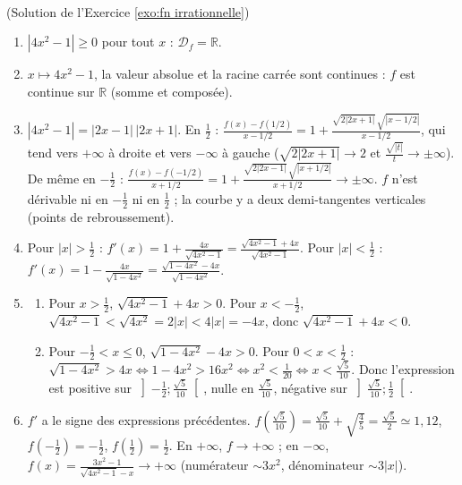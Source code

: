 \begin{corrige}
\begin{sol} ~ \\
(Solution de l'Exercice \ref{exo:fn irrationnelle})
\begin{enumerate}
\item $|4x^2 - 1| \geq 0$ pour tout $x$ : $\mathcal{D}_f = \mathbb{R}$.
\item $x \mapsto 4x^2 - 1$, la valeur absolue et la racine carr\'ee sont continues : $f$ est continue sur $\mathbb{R}$ (somme et compos\'ee).
\item $|4x^2 - 1| = |2x - 1|\,|2x + 1|$. En $\frac{1}{2}$ : $\frac{f(x) - f(1/2)}{x - 1/2} = 1 + \frac{\sqrt{2|2x+1|}\,\sqrt{|x - 1/2|}}{x - 1/2}$,
      qui tend vers $+\infty$ \`a droite et vers $-\infty$ \`a gauche ($\sqrt{2|2x+1|} \to 2$ et $\frac{\sqrt{|t|}}{t} \to \pm\infty$).
      De m\^eme en $-\frac{1}{2}$ : $\frac{f(x) - f(-1/2)}{x + 1/2} = 1 + \frac{\sqrt{2|2x-1|}\,\sqrt{|x+1/2|}}{x + 1/2} \to \pm\infty$.
      $f$ n'est d\'erivable ni en $-\frac{1}{2}$ ni en $\frac{1}{2}$ ; la courbe y a deux demi-tangentes verticales (points de rebroussement).
\item Pour $|x| > \frac{1}{2}$ : $f'(x) = 1 + \frac{4x}{\sqrt{4x^2-1}} = \frac{\sqrt{4x^2-1} + 4x}{\sqrt{4x^2-1}}$.
      Pour $|x| < \frac{1}{2}$ : $f'(x) = 1 - \frac{4x}{\sqrt{1-4x^2}} = \frac{\sqrt{1-4x^2} - 4x}{\sqrt{1-4x^2}}$.
\item \begin{enumerate}
      \item Pour $x > \frac{1}{2}$, $\sqrt{4x^2-1} + 4x > 0$. Pour $x < -\frac{1}{2}$, $\sqrt{4x^2-1} < \sqrt{4x^2} = 2|x| < 4|x| = -4x$, donc
            $\sqrt{4x^2 - 1} + 4x < 0$.
      \item Pour $-\frac{1}{2} < x \leq 0$, $\sqrt{1-4x^2} - 4x > 0$. Pour $0 < x < \frac{1}{2}$ :
            $\sqrt{1 - 4x^2} > 4x \iff 1 - 4x^2 > 16x^2 \iff x^2 < \frac{1}{20} \iff x < \frac{\sqrt{5}}{10}$.
            Donc l'expression est positive sur $\left]-\frac{1}{2};\frac{\sqrt{5}}{10}\right[$, nulle en $\frac{\sqrt{5}}{10}$, n\'egative sur $\left]\frac{\sqrt{5}}{10};\frac{1}{2}\right[$.
      \end{enumerate}
\item $f'$ a le signe des expressions pr\'ec\'edentes. $f\left(\frac{\sqrt{5}}{10}\right) = \frac{\sqrt{5}}{10} + \sqrt{\frac{4}{5}} = \frac{\sqrt{5}}{2} \simeq 1{,}12$,
      $f\left(-\frac{1}{2}\right) = -\frac{1}{2}$, $f\left(\frac{1}{2}\right) = \frac{1}{2}$.
      En $+\infty$, $f \to +\infty$ ; en $-\infty$, $f(x) = \frac{3x^2 - 1}{\sqrt{4x^2 - 1} - x} \to +\infty$ (num\'erateur $\sim 3x^2$, d\'enominateur $\sim 3|x|$).

\end{enumerate}
\end{sol}
\end{corrige}
